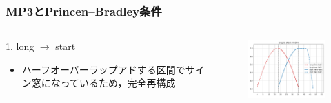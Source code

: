 \documentclass[14pt,xcolor=dvipsnames,table,dvipdfmx]{beamer}
\begin{document}
\begin{frame}[c]
    \frametitle{MP3とPrincen--Bradley条件}
    \begin{columns}
        \begin{column}{0.45\textwidth}
            1. long $\rightarrow$ start
            \begin{itemize}
                \item ハーフオーバーラップアドする区間でサイン窓になっているため，完全再構成
            \end{itemize}
        \end{column}
        \begin{column}{0.55\textwidth}
            \begin{figure}
                \includegraphics[width=68mm]{./figs/long_to_start_window.pdf}
            \end{figure}
        \end{column}
    \end{columns}
\end{frame}
\end{document}
